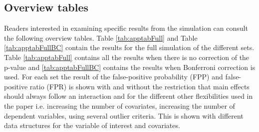 \subsection{Overview tables}
\label{overviewtable}
Readers interested in examining specific results from the simulation can consult the following overview tables. Table \ref{tab:apptabFull} and Table \ref{tab:apptabFullBC} contain the results for the full simulation of the different sets. Table \ref{tab:apptabFull} contains all the results when there is no correction of the p-value and \ref{tab:apptabFullBC} contains the results when Bonferroni correction is used. For each set the result of the false-positive probability (FPP) and false-positive ratio (FPR) is shown with and without the restriction that main effects should always follow an interaction and for the different other flexibilities used in the paper i.e. increasing the number of covariates, increasing the number of dependent variables, using several outlier criteria. This is shown with different data structures for the variable of interest and covariates. 
\begin{landscape}
\scriptsize

\end{landscape}

\begin{landscape}
\scriptsize

\end{landscape}


